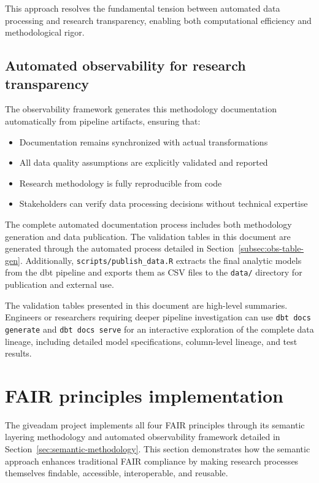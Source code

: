 \documentclass{article}
\begin{document}
This approach resolves the fundamental tension between automated data processing and research transparency, enabling both computational efficiency and methodological rigor.

\subsection{Automated observability for research transparency}

The observability framework generates this methodology documentation automatically from pipeline artifacts, ensuring that:
\begin{itemize}
    \item Documentation remains synchronized with actual transformations
    \item All data quality assumptions are explicitly validated and reported
    \item Research methodology is fully reproducible from code
    \item Stakeholders can verify data processing decisions without technical expertise
\end{itemize}

The complete automated documentation process includes both methodology generation and data publication. The validation tables in this document are generated through the automated process detailed in Section~\ref{subsec:obs-table-gen}. Additionally, \texttt{scripts/publish\_data.R} extracts the final analytic models from the dbt pipeline and exports them as CSV files to the \texttt{data/} directory for publication and external use.

The validation tables presented in this document are high-level summaries. Engineers or researchers requiring deeper pipeline investigation can use \texttt{dbt docs generate} and \texttt{dbt docs serve} for an interactive exploration of the complete data lineage, including detailed model specifications, column-level lineage, and test results.

\section{FAIR principles implementation}
\label{sec:fair}

The giveadam project implements all four FAIR principles \cite{wilkinson2016fair} through its semantic layering methodology and automated observability framework detailed in Section~\ref{sec:semantic-methodology}. This section demonstrates how the semantic approach enhances traditional FAIR compliance by making research processes themselves findable, accessible, interoperable, and reusable.
\end{document}
